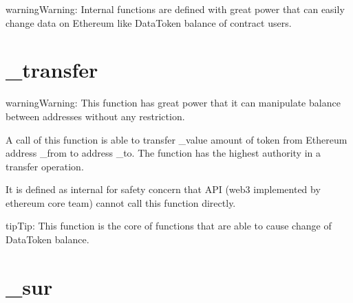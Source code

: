\documentclass[letterpaper,10pt,english]{sphinxmanual}
\begin{document}
\begin{sphinxadmonition}{warning}{Warning:}
Internal functions are defined with great power that can easily change data on Ethereum like DataToken balance of contract users.
\end{sphinxadmonition}


\section{\_transfer}
\label{\detokenize{index:id1}}
%
\begin{sphinxVerbatim}[commandchars=\\\{\}]
      
\end{sphinxVerbatim}

\begin{sphinxadmonition}{warning}{Warning:}
This function has great power that it can manipulate balance between addresses without any restriction.
\end{sphinxadmonition}

A call of this function is able to transfer \_value amount of token
from Ethereum address \_from to address \_to. The function has the
highest authority in a transfer operation.

It is defined as internal
for safety concern that API (web3 implemented by ethereum core team)
cannot call this function directly.

\begin{sphinxadmonition}{tip}{Tip:}
This function is the core of functions that are able to cause change of DataToken balance.
\end{sphinxadmonition}


\section{\_sur}
\label{\detokenize{index:id2}}
%
\begin{sphinxVerbatim}[commandchars=\\\{\}]
      
\end{sphinxVerbatim}
\end{document}
